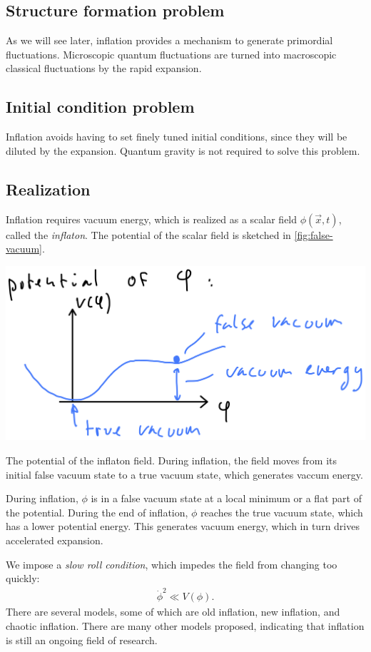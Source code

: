 \subsection{Structure formation problem}
As we will see later, inflation provides a mechanism to generate primordial fluctuations. Microscopic quantum fluctuations are turned into macroscopic classical fluctuations by the rapid expansion.

\subsection{Initial condition problem}
Inflation avoids having to set finely tuned initial conditions, since they will be diluted by the expansion. Quantum gravity is not required to solve this problem.


\subsection{Realization}
Inflation requires vacuum energy, which is realized as a scalar field $\phi(\vec{x}, t)$, called the \emph{inflaton}. The potential of the scalar field is sketched in \cref{fig:false-vacuum}.

\begin{marginfigure}
	\centering
	\includegraphics[width=\textwidth]{img/ch-02/false-vacuum.png}
	\caption{The potential of the inflaton field. During inflation, the field moves from its initial false vacuum state to a true vacuum state, which generates vaccum energy.}
	\label{fig:false-vacuum}
\end{marginfigure}

During inflation, $\phi$ is in a false vacuum state at a local minimum  or a flat part of the potential. During the end of inflation, $\phi$ reaches the true vacuum state, which has a lower potential energy. This generates vacuum energy, which in turn drives accelerated expansion.

We impose a \emph{slow roll condition}, which impedes the field from changing too quickly:
\begin{align*}
	\dot{\phi}^2 \ll V(\phi).
\end{align*}
There are several models, some of which are old inflation, new inflation, and chaotic inflation. There are many other models proposed, indicating that inflation is still an ongoing field of research.



